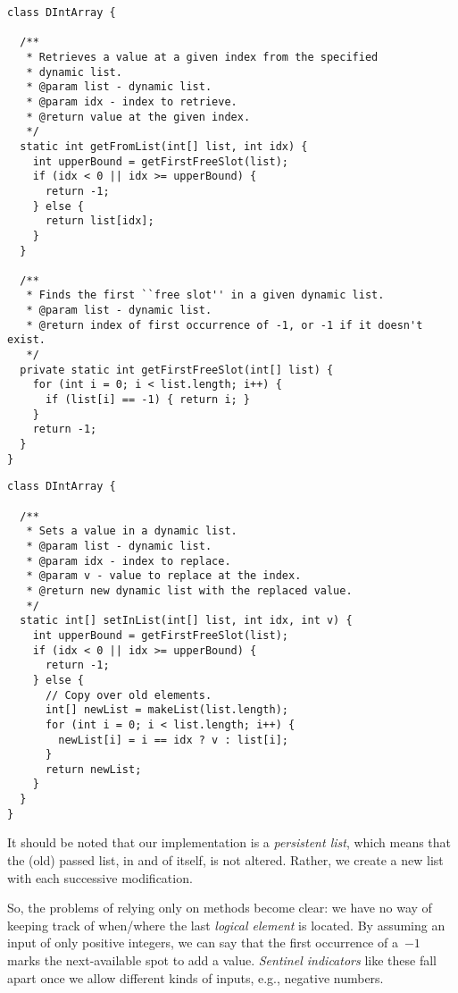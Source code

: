 \begin{lstlisting}[language=MyJava]
class DIntArray {

  /**
   * Retrieves a value at a given index from the specified
   * dynamic list.
   * @param list - dynamic list. 
   * @param idx - index to retrieve. 
   * @return value at the given index.
   */
  static int getFromList(int[] list, int idx) {
    int upperBound = getFirstFreeSlot(list);
    if (idx < 0 || idx >= upperBound) {
      return -1;
    } else {
      return list[idx];
    }
  }

  /**
   * Finds the first ``free slot'' in a given dynamic list.
   * @param list - dynamic list.
   * @return index of first occurrence of -1, or -1 if it doesn't exist.
   */
  private static int getFirstFreeSlot(int[] list) {
    for (int i = 0; i < list.length; i++) {
      if (list[i] == -1) { return i; }
    }
    return -1;
  }
}
\end{lstlisting}

\begin{lstlisting}[language=MyJava]
class DIntArray {

  /**
   * Sets a value in a dynamic list. 
   * @param list - dynamic list.
   * @param idx - index to replace.
   * @param v - value to replace at the index.
   * @return new dynamic list with the replaced value.
   */
  static int[] setInList(int[] list, int idx, int v) {
    int upperBound = getFirstFreeSlot(list);
    if (idx < 0 || idx >= upperBound) {
      return -1;
    } else {
      // Copy over old elements.
      int[] newList = makeList(list.length);
      for (int i = 0; i < list.length; i++) {
        newList[i] = i == idx ? v : list[i];  
      }
      return newList;
    }
  }
}
\end{lstlisting}

It should be noted that our implementation is a \emph{persistent list}, which means that the (old) passed list, in and of itself, is not altered. 
Rather, we create a new list with each successive modification.

So, the problems of relying only on methods become clear: we have no way of keeping track of when/where the last \emph{logical element} is located. 
By assuming an input of only positive integers, we can say that the first occurrence of a~$-1$ marks the next-available spot to add a value. \emph{Sentinel indicators} like these fall apart once we allow different kinds of inputs, e.g., negative numbers. 

